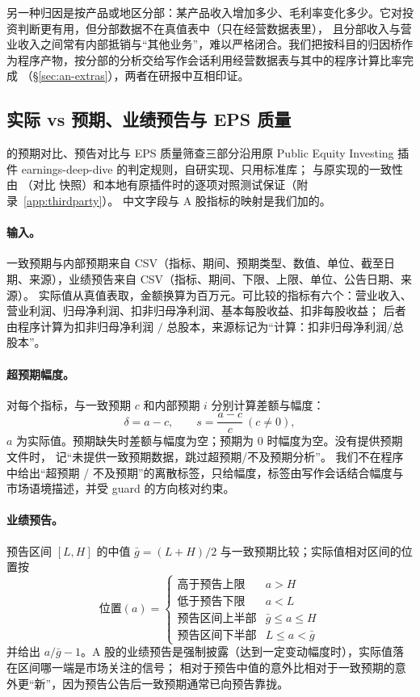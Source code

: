 \begin{tradeoff}
另一种归因是按产品或地区分部：某产品收入增加多少、毛利率变化多少。它对投资判断更有用，但分部数据不在真值表中（只在经营数据表里），
且分部收入与营业收入之间常有内部抵销与“其他业务”，难以严格闭合。我们把按科目的归因桥作为程序产物，按分部的分析交给写作会话利用经营数据表与其中的程序计算比率完成
（\S\ref{sec:an-extras}），两者在研报中互相印证。
\end{tradeoff}

\subsection{实际 vs 预期、业绩预告与 EPS 质量}
\label{sec:an-earnings}

 的预期对比、预告对比与 EPS 质量筛查三部分沿用原 Public Equity Investing 插件 earnings-deep-dive 的判定规则，自研实现、只用标准库；
与原实现的一致性由 （对比  快照）和本地有原插件时的逐项对照测试保证（附录~\ref{app:thirdparty}）。
中文字段与 A 股指标的映射是我们加的。

\paragraph{输入。}
一致预期与内部预期来自 CSV（指标、期间、预期类型、数值、单位、截至日期、来源），业绩预告来自 CSV（指标、期间、下限、上限、单位、公告日期、来源）。
实际值从真值表取，金额换算为百万元。可比较的指标有六个：营业收入、营业利润、归母净利润、扣非归母净利润、基本每股收益、扣非每股收益；
后者由程序计算为扣非归母净利润 $/$ 总股本，来源标记为“计算：扣非归母净利润/总股本”。

\paragraph{超预期幅度。}
对每个指标，与一致预期 $c$ 和内部预期 $i$ 分别计算差额与幅度：
\[
\delta = a-c,\qquad s=\frac{a-c}{c}\ (c\neq0),
\]
$a$ 为实际值。预期缺失时差额与幅度为空；预期为 0 时幅度为空。没有提供预期文件时， 记“未提供一致预期数据，跳过超预期/不及预期分析”。
我们不在程序中给出“超预期 / 不及预期”的离散标签，只给幅度，标签由写作会话结合幅度与市场语境描述，并受 guard 的方向核对约束。

\paragraph{业绩预告。}
预告区间 $[L,H]$ 的中值 $\bar g=(L+H)/2$ 与一致预期比较；实际值相对区间的位置按
\[
\text{位置}(a)=\begin{cases}
\text{高于预告上限} & a>H\\ \text{低于预告下限} & a<L\\ \text{预告区间上半部} & \bar g\le a\le H\\ \text{预告区间下半部} & L\le a<\bar g
\end{cases}
\]
并给出 $a/\bar g-1$。A 股的业绩预告是强制披露（达到一定变动幅度时），实际值落在区间哪一端是市场关注的信号；
相对于预告中值的意外比相对于一致预期的意外更“新”，因为预告公告后一致预期通常已向预告靠拢。


